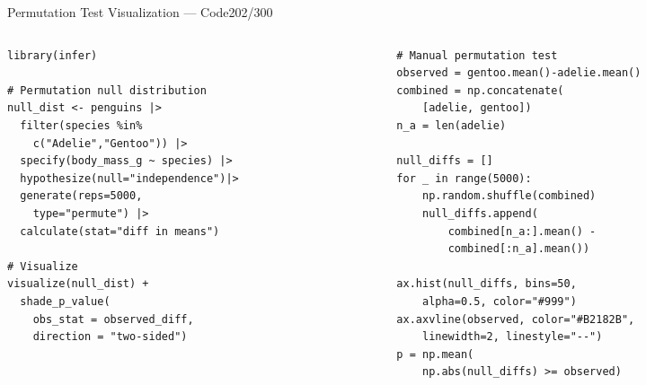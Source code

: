 \documentclass[10pt]{beamer}
\newcommand{\smark}[1]{\hfill{\scriptsize\color{codegray}#1}}
\begin{document}
\begin{frame}[fragile]{Permutation Test Visualization --- Code}\smark{202/300}
\begin{columns}[T]
\begin{column}{0.48\textwidth}
\begin{lstlisting}[style=Rstyle]
library(infer)

# Permutation null distribution
null_dist <- penguins |>
  filter(species %in%
    c("Adelie","Gentoo")) |>
  specify(body_mass_g ~ species) |>
  hypothesize(null="independence")|>
  generate(reps=5000,
    type="permute") |>
  calculate(stat="diff in means")

# Visualize
visualize(null_dist) +
  shade_p_value(
    obs_stat = observed_diff,
    direction = "two-sided")
\end{lstlisting}
\end{column}
\begin{column}{0.48\textwidth}
\begin{lstlisting}[style=Pystyle]
# Manual permutation test
observed = gentoo.mean()-adelie.mean()
combined = np.concatenate(
    [adelie, gentoo])
n_a = len(adelie)

null_diffs = []
for _ in range(5000):
    np.random.shuffle(combined)
    null_diffs.append(
        combined[n_a:].mean() -
        combined[:n_a].mean())

ax.hist(null_diffs, bins=50,
    alpha=0.5, color="#999")
ax.axvline(observed, color="#B2182B",
    linewidth=2, linestyle="--")
p = np.mean(
    np.abs(null_diffs) >= observed)
\end{lstlisting}
\end{column}
\end{columns}
\end{frame}
\end{document}
